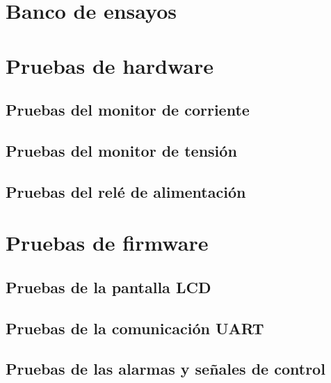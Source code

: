 \section{Banco de ensayos}



\section{Pruebas de hardware}
\label{sec:pruebasHW}


\subsection{Pruebas del monitor de corriente}



\subsection{Pruebas del monitor de tensión}



\subsection{Pruebas del relé de alimentación}



\section{Pruebas de firmware}
\label{sec:pruebasFW}



\subsection{Pruebas de la pantalla LCD}

\subsection{Pruebas de la comunicación UART}

\subsection{Pruebas de las alarmas y señales de control}